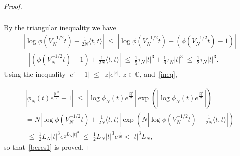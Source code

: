 \documentclass[AHL,Unicode,longabstracts,published]{cedram}
\renewcommand{\leq}{\;\leqslant\;}
\newcommand{\scalar}[2]{\langle #1, #2\rangle}
\newcommand{\bbC}{\mathbb{C}}
\begin{document}
\begin{proof}
\begin{multline}
\begin{aligned}
\end{aligned}
\end{multline}
By the triangular inequality we have
\begin{multline}
\left|\log\phi\left(V_N^{-1/2}t\right)+\frac{1}{2N}\scalar{t}{t}\right| \leq \left|\log\phi\left(V_N^{-1/2}t\right) - \left(\phi\left(V_N^{-1/2}t\right)-1\right)\right|\\
+\left|\left(\phi\left(V_N^{-1/2}t\right)-1\right)+\frac{1}{2N}\scalar{t}{t}\right| \leq \frac{1}{5}\tau_N|t|^3 + \frac{1}{6}\tau_N|t|^3 \leq \frac{1}{2}\tau_N|t|^3.
\end{multline}
Using the inequality $|e^z-1|\leq |z|e^{|z|}$, $z \in \bbC$, and~\eqref{ineq},

\begin{multline}
\left|\phi_N(t)e^{\frac{|t|^2}{2}}-1\right| \leq\left|\log \phi_N(t)e^{\frac{|t|^2}{2}}\right|\exp\left(\left|\log \phi_N(t)e^{\frac{|t|^2}{2}}\right|\right) \\
=N\left|\log \phi\left(V_N^{-1/2}t\right)+\frac{1}{2N}\scalar{t}{t}\right|\exp\left(N\left|\log \phi\left(V_N^{-1/2}t\right)+\frac{1}{2N}\scalar{t}{t}\right|
\right) \\
\leq \frac{1}{2}L_N|t|^3e^{\frac{1}{2}L_N|t|^3}
\leq \frac{1}{2}L_N|t|^3e^{\frac{1}{16}} <|t|^3L_N,
\end{multline}
so that~\eqref{beres1} is proved.
\end{proof}
\end{document}

